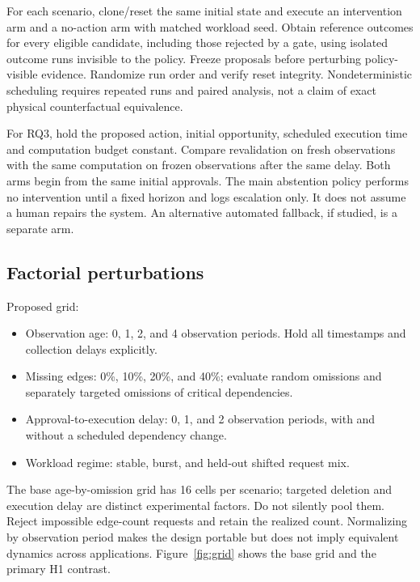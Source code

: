 ﻿\documentclass[sigconf,nonacm]{acmart}
\begin{document}
For each scenario, clone/reset the same initial state and execute an intervention arm and a no-action arm with matched workload seed. Obtain reference outcomes for every eligible candidate, including those rejected by a gate, using isolated outcome runs invisible to the policy. Freeze proposals before perturbing policy-visible evidence. Randomize run order and verify reset integrity. Nondeterministic scheduling requires repeated runs and paired analysis, not a claim of exact physical counterfactual equivalence.

For RQ3, hold the proposed action, initial opportunity, scheduled execution time and computation budget constant. Compare revalidation on fresh observations with the same computation on frozen observations after the same delay. Both arms begin from the same initial approvals. The main abstention policy performs no intervention until a fixed horizon and logs escalation only. It does not assume a human repairs the system. An alternative automated fallback, if studied, is a separate arm.

\subsection{Factorial perturbations}
Proposed grid:
\begin{itemize}
\item Observation age: 0, 1, 2, and 4 observation periods. Hold all timestamps and collection delays explicitly.
\item Missing edges: 0\%, 10\%, 20\%, and 40\%; evaluate random omissions and separately targeted omissions of critical dependencies.
\item Approval-to-execution delay: 0, 1, and 2 observation periods, with and without a scheduled dependency change.
\item Workload regime: stable, burst, and held-out shifted request mix.
\end{itemize}
The base age-by-omission grid has 16 cells per scenario; targeted deletion and execution delay are distinct experimental factors. Do not silently pool them. Reject impossible edge-count requests and retain the realized count. Normalizing by observation period makes the design portable but does not imply equivalent dynamics across applications. Figure~\ref{fig:grid} shows the base grid and the primary H1 contrast.
\end{document}
